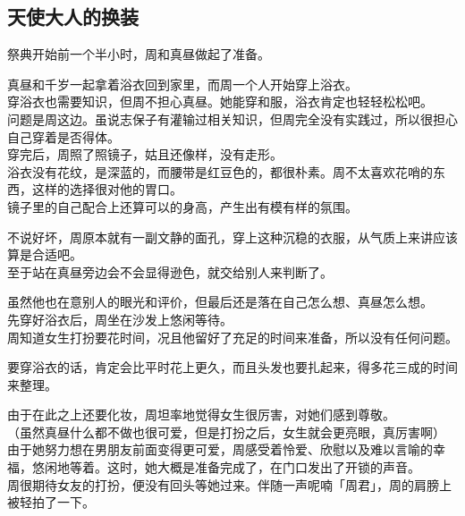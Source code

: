 \subsection{天使大人的换装}

祭典开始前一个半小时，周和真昼做起了准备。

真昼和千岁一起拿着浴衣回到家里，而周一个人开始穿上浴衣。\\

穿浴衣也需要知识，但周不担心真昼。她能穿和服，浴衣肯定也轻轻松松吧。\\

问题是周这边。虽说志保子有灌输过相关知识，但周完全没有实践过，所以很担心自己穿着是否得体。\\

穿完后，周照了照镜子，姑且还像样，没有走形。\\

浴衣没有花纹，是深蓝的，而腰带是红豆色的，都很朴素。周不太喜欢花哨的东西，这样的选择很对他的胃口。\\

镜子里的自己配合上还算可以的身高，产生出有模有样的氛围。

不说好坏，周原本就有一副文静的面孔，穿上这种沉稳的衣服，从气质上来讲应该算是合适吧。\\

至于站在真昼旁边会不会显得逊色，就交给别人来判断了。

虽然他也在意别人的眼光和评价，但最后还是落在自己怎么想、真昼怎么想。\\

先穿好浴衣后，周坐在沙发上悠闲等待。\\

周知道女生打扮要花时间，况且他留好了充足的时间来准备，所以没有任何问题。

要穿浴衣的话，肯定会比平时花上更久，而且头发也要扎起来，得多花三成的时间来整理。

由于在此之上还要化妆，周坦率地觉得女生很厉害，对她们感到尊敬。\\

（虽然真昼什么都不做也很可爱，但是打扮之后，女生就会更亮眼，真厉害啊）\\

由于她努力想在男朋友前面变得更可爱，周感受着怜爱、欣慰以及难以言喻的幸福，悠闲地等着。这时，她大概是准备完成了，在门口发出了开锁的声音。\\

周很期待女友的打扮，便没有回头等她过来。伴随一声呢喃「周君」，周的肩膀上被轻拍了一下。

